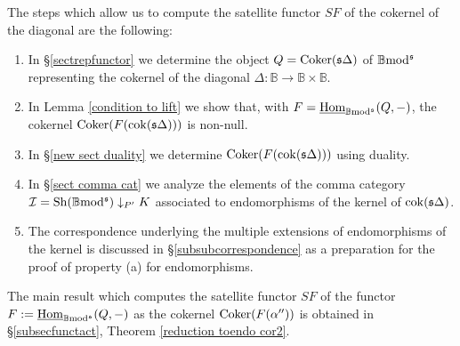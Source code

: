 \documentclass[12pt]{article}
\def\Homi{{\underline{\rm Hom}}}
\def\coker{{\rm Coker}}
\def\scoker{{\rm cok}}
\def\B{{\mathbb B}}
\def\cI{{\mathcal I}}
\def\sequ{{\rm Sh}}
\def\yb{\mathfrak{s}}
\def\b2{{\rm \B mod^{\mathfrak s}}}
\begin{document}
The steps which allow us to compute the satellite functor $SF$ of the cokernel of the diagonal are the following:
\begin{enumerate}
\item In \S \ref{sectrepfunctor} we determine the object $Q=\coker(\yb\Delta)$ of $\b2$ representing the cokernel of the diagonal $\Delta:\B\to \B\times \B$.
\item In Lemma \ref{condition to lift} we show  that, with $F=\Homi_\b2(Q,-)$, the cokernel $\coker(F(\scoker(\yb\Delta)))$ is non-null.
\item  In \S \ref{new sect duality} we determine  $\coker(F(\scoker(\yb\Delta)))$ using duality.
\item  In \S \ref{sect comma cat} we analyze the elements of the comma category $\cI=\sequ(\b2)\downarrow_{P'} K$ associated to endomorphisms of the kernel of $\scoker(\yb\Delta)$.
\item The correspondence underlying the multiple extensions of endomorphisms of the kernel is discussed in \S \ref{subsubcorrespondence} as a preparation for the proof of property (a) for endomorphisms.
\end{enumerate}
The main result which computes the satellite functor $SF$ of the functor $F:=\Homi_\b2(Q,-)$ as the cokernel $\coker(F(\alpha''))$ is obtained in \S \ref{subsecfunctact}, Theorem \ref{reduction toendo cor2}.
\end{document}
